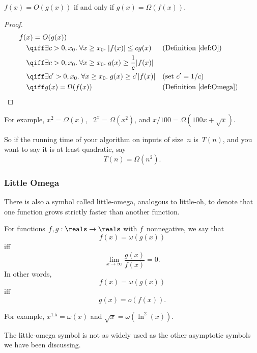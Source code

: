 \begin{theorem}\label{thm:9S2}
$f(x) = O(g(x))$ if and only if $g(x) = \Omega(f(x))$.
\end{theorem}

\begin{proof}
\begin{align*}
\lefteqn{f(x) = O(g(x))} \quad &\\
   & \qiff \exists c > 0, x_0. \; \forall x \ge x_0. \;
            |f(x)| \le c g(x) 
        && \text{(Definition~\ref{def:O})} \\
    & \qiff \exists c > 0, x_0. \; \forall x \ge x_0. \;
            g(x) \ge \frac{1}{c} |f(x)| \\
    & \qiff \exists c' > 0, x_0. \; \forall x \ge x_0. \;
            g(x) \ge c' |f(x)|
        && \text{(set $c' = 1/c$)} \\
    & \qiff g(x) = \Omega(f(x))
        && \text{(Definition~\ref{def:Omega})}
\qedhere
\end{align*}
\end{proof}

For example, $x^2 = \Omega(x)$, \ $2^x = \Omega(x^2)$, and $x/100 =
\Omega(100 x + \sqrt{x})$.

So if the running time of your algorithm on inputs of size~$n$
is~$T(n)$, and you want to say it is at least quadratic, say
\[
    T(n) = \Omega(n^2).
\]

\subsubsection{Little Omega}
                                   
There is also a symbol called little-omega, analogous to little-oh, to
denote that one function grows strictly faster than another function.

\begin{definition}\label{def:omega}
For functions $f, g: \reals \to \reals$ with $f$~nonnegative, we say
that
\[
    f(x) = \omega(g(x))
\]
iff
\[
    \lim_{x \to \infty} \frac{g(x)}{f(x)} = 0.
\]
In other words,
\[
    f(x) = \omega(g(x))
\]
iff
\[
    g(x) = o(f(x)).
\]
\end{definition}

For example, $x^{1.5} = \omega(x)$ and $\sqrt{x} = \omega(\ln^2(x))$.

The little-omega symbol is not as widely used as the other asymptotic
symbols we have been discussing.
\fi

